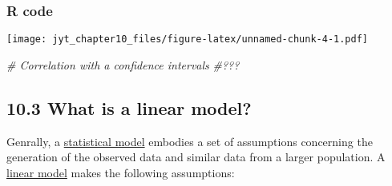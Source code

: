 \documentclass[]{article}
\newenvironment{Shaded}{\begin{snugshade}}{\end{snugshade}}
\newcommand{\CommentTok}[1]{\textcolor[rgb]{0.56,0.35,0.01}{\textit{#1}}}
\newcommand{\DecValTok}[1]{\textcolor[rgb]{0.00,0.00,0.81}{#1}}
\newcommand{\KeywordTok}[1]{\textcolor[rgb]{0.13,0.29,0.53}{\textbf{#1}}}
\newcommand{\NormalTok}[1]{#1}
\newcommand{\OperatorTok}[1]{\textcolor[rgb]{0.81,0.36,0.00}{\textbf{#1}}}
\newcommand{\StringTok}[1]{\textcolor[rgb]{0.31,0.60,0.02}{#1}}
\begin{document}
\hypertarget{r-code-1}{%
\subsubsection{R code}\label{r-code-1}}

\begin{Shaded}
\end{Shaded}

\texttt{[image: jyt\_chapter10\_files/figure-latex/unnamed-chunk-4-1.pdf]}

\begin{Shaded}
\begin{Highlighting}[]
\CommentTok{# Correlation with a confidence intervals}
\CommentTok{#???}
\end{Highlighting}
\end{Shaded}

\hypertarget{what-is-a-linear-model}{%
\subsection{10.3 What is a linear model?}\label{what-is-a-linear-model}}

Genrally, a
\href{https://en.wikipedia.org/wiki/Statistical_model}{statistical
model} embodies a set of assumptions concerning the generation of the
observed data and similar data from a larger population. A
\href{https://en.wikipedia.org/wiki/Linear_regression}{linear model}
makes the following assumptions:
\end{document}
